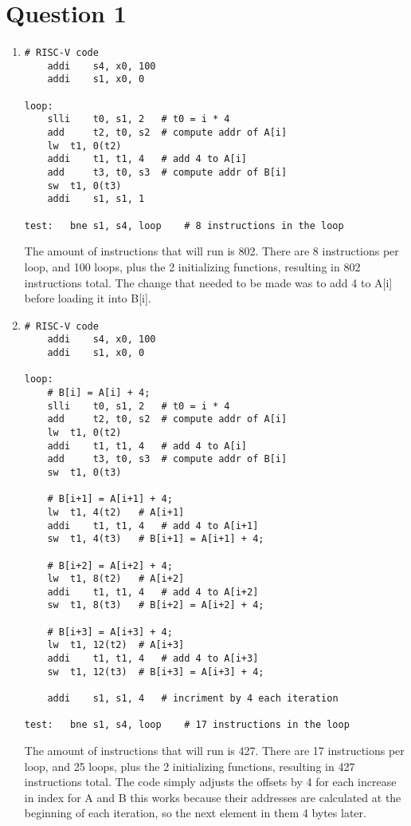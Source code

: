 \documentclass[12pt,letterpaper]{article}
\begin{document}
\section*{Question 1}

\begin{enumerate}[label=\alph*]
  \item
     \begin{lstlisting}[style = Python]
# RISC-V code
	addi 	s4, x0, 100
	addi 	s1, x0, 0

loop:
	slli 	t0, s1, 2 	# t0 = i * 4
	add 	t2, t0, s2 	# compute addr of A[i]
	lw 	t1, 0(t2)
	addi	t1, t1, 4	# add 4 to A[i]
	add 	t3, t0, s3 	# compute addr of B[i]
	sw 	t1, 0(t3)
	addi 	s1, s1, 1
	
test: 	bne s1, s4, loop 	# 8 instructions in the loop
    \end{lstlisting}

The amount of instructions that will run is 802. There are 8 instructions per loop, and 100 loops, plus the 2 initializing functions, resulting in 802 instructions total. The change that needed to be made was to add 4 to A[i] before loading it into B[i].

\newpage
  \item
     \begin{lstlisting}[style = Python]
# RISC-V code
	addi 	s4, x0, 100
	addi 	s1, x0, 0

loop:
	# B[i] = A[i] + 4;
	slli 	t0, s1, 2 	# t0 = i * 4
	add 	t2, t0, s2 	# compute addr of A[i]
	lw 	t1, 0(t2)
	addi	t1, t1, 4	# add 4 to A[i]
	add 	t3, t0, s3	# compute addr of B[i]
	sw 	t1, 0(t3)
	
	# B[i+1] = A[i+1] + 4;
	lw 	t1, 4(t2)	# A[i+1]
	addi	t1, t1, 4	# add 4 to A[i+1]
	sw 	t1, 4(t3)	# B[i+1] = A[i+1] + 4;

	# B[i+2] = A[i+2] + 4;
	lw 	t1, 8(t2)	# A[i+2]
	addi	t1, t1, 4	# add 4 to A[i+2]
	sw 	t1, 8(t3)	# B[i+2] = A[i+2] + 4;
	
	# B[i+3] = A[i+3] + 4;
	lw 	t1, 12(t2)	# A[i+3]
	addi	t1, t1, 4	# add 4 to A[i+3]
	sw 	t1, 12(t3)	# B[i+3] = A[i+3] + 4;
	
	addi 	s1, s1, 4	# incriment by 4 each iteration
	
test: 	bne s1, s4, loop 	# 17 instructions in the loop
    \end{lstlisting}

The amount of instructions that will run is 427. There are 17 instructions per loop, and 25 loops, plus the 2 initializing functions, resulting in 427 instructions total. The code simply adjusts the offsets by 4 for each increase in index for A and B this works because their addresses are calculated at the beginning of each iteration, so the next element in them 4 bytes later. 

\end{enumerate}
\end{document}
